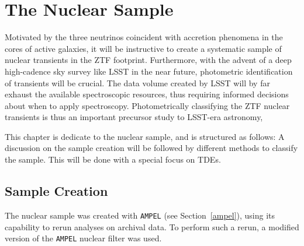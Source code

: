 \chapter{The Nuclear Sample}\label{ztf}
Motivated by the three neutrinos coincident with accretion phenomena in the cores of active galaxies, it will be instructive to create a systematic sample of nuclear transients in the ZTF footprint. Furthermore, with the advent of a deep high-cadence sky survey like LSST in the near future, photometric identification of transients will be crucial. The data volume created by LSST will by far exhaust the available spectroscopic resources, thus requiring informed decisions about when to apply spectroscopy. Photometrically classifying the ZTF nuclear transients is thus an important precursor study to LSST-era astronomy,

This chapter is dedicate to the nuclear sample, and is structured as follows: A discussion on the sample creation will be followed by different methods to classify the sample. This will be done with a special focus on TDEs.

\section{Sample Creation}
The nuclear sample was created with \texttt{AMPEL} (see Section~\ref{ampel}), using its capability to rerun analyses on archival data. To perform such a rerun, a modified version of the \texttt{AMPEL} nuclear filter was used.

